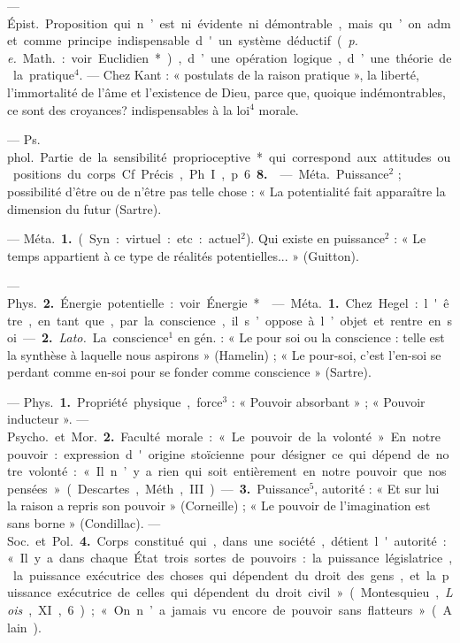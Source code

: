 \begin{itemize}[leftmargin=1cm, label=, itemsep=1pt]
 — \si{Épist.} Proposition qui
n’est ni évidente ni démontrable,
mais qu’on admet comme principe
indispensable d'un système déductif
({\it p. e.} \si{Math.} : voir Euclidien*), d’une
opération logique, d’une théorie de
la pratique$^4$. — Chez Kant : « postulats de la raison pratique », la liberté, l’immortalité de l'âme et
l’existence de Dieu, parce que,
quoique indémontrables, ce sont des
croyances? indispensables à la loi$^4$
morale.

 — \si{Ps. phol.}
Partie de la sensibilité proprioceptive* qui correspond aux attitudes
ou positions du corps. Cf Précis,
Ph. I, p. 6 {\bf 8.}

 — \si{Méta.} Puissance$^2$ ; possibilité d’être ou de n'être pas telle
chose : « La potentialité fait apparaître la dimension du futur
(Sartre).

 — \si{Méta.} {\bf 1.} (Syn. : virtuel:
etc. : actuel$^2$). Qui existe en puissance$^2$ : « Le temps appartient à ce
type de réalités potentielles... »
(Guitton).

— \si{Phys.} {\bf 2.} Énergie potentielle :
voir Énergie*.

 — \si{Méta.} {\bf 1.} Chez Hegel : l'être,
en tant que, par la conscience, il
s’oppose à l’objet et rentre en soi. —
 {\bf 2.} {\it Lato.} La conscience$^1$ en gén. : « Le
pour soi ou la conscience : telle est
la synthèse à laquelle nous aspirons » (Hamelin) ; « Le pour-soi, c’est
l’en-soi se perdant comme en-soi
pour se fonder comme conscience »
(Sartre).

 — \si{Phys.} {\bf 1.} Propriété physique, force$^3$ : « Pouvoir absorbant » ;
« Pouvoir inducteur ». — \si{Psycho.} et
\si{Mor.} {\bf 2.} Faculté morale : « Le pouvoir de la volonté ». En notre pouvoir : expression d'origine stoïcienne
pour désigner ce qui
dépend de notre volonté : « Il n’y a
rien qui soit entièrement en notre
pouvoir que nos pensées » (Descartes,
Méth., III). — {\bf 3.} Puissance$^5$, autorité : « Et sur lui la raison a repris
son pouvoir » (Corneille) ; « Le pouvoir de l'imagination est sans
borne » (Condillac). — \si{Soc.} et \si{Pol.}
 {\bf 4.} Corps constitué qui, dans une
société, détient l'autorité : « Il y a
dans chaque État trois sortes de
pouvoirs : la puissance législatrice,
la puissance exécutrice des choses
qui dépendent du droit des gens, et
la puissance exécutrice de celles qui
dépendent du droit civil » (Montesquieu, {\it Lois}, XI, 6) ; « On n’a jamais
vu encore de pouvoir sans flatteurs »
(Alain).


\end{itemize}
